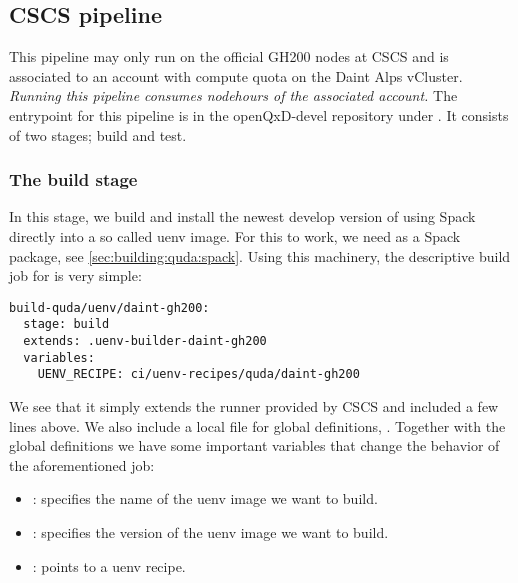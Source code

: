 
\subsection{CSCS pipeline}
\label{sec:cicd:pipeline:cscs}

This pipeline may only run on the official GH200 nodes at CSCS and is associated to an account with compute quota on the Daint Alps vCluster.
\emph{Running this pipeline consumes nodehours of the associated account.}
The entrypoint for this pipeline is in the openQxD-devel repository\cite{gitlab:openqxd-devel} under .
It consists of two stages; build and test.

\subsubsection{The build stage}

In this stage, we build and install the newest develop version of \quda using Spack\cite{Gamblin_The_Spack_Package_2015} directly into a so called uenv\cite{online:cscs:uenv} image.
For this to work, we need \quda as a Spack package, see \cref{sec:building:quda:spack}.
Using this machinery, the descriptive build job for \quda is very simple:
\begin{verbatim}
build-quda/uenv/daint-gh200:
  stage: build
  extends: .uenv-builder-daint-gh200
  variables:
    UENV_RECIPE: ci/uenv-recipes/quda/daint-gh200
\end{verbatim}
We see that it simply extends the runner  provided by CSCS and included a few lines above.
We also include a local file for global definitions, .
Together with the global definitions we have some important variables that change the behavior of the aforementioned job:
\begin{itemize}
  \item {}: specifies the name of the uenv image we want to build.
  \item {}: specifies the version of the uenv image we want to build.
  \item {}: points to a uenv recipe.
\end{itemize}

